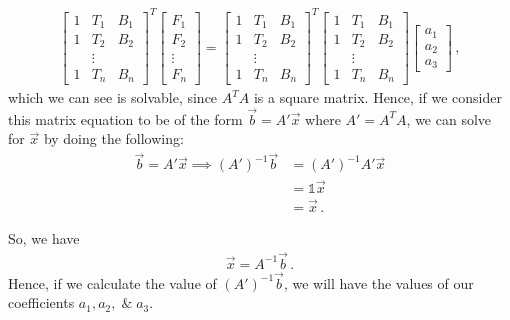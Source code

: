 \documentclass[11pt]{article}
\begin{document}
\begin{align*}
    \begin{bmatrix}
        1 & T_1 & B_1 \\
        1 & T_2 & B_2 \\
        & \vdots & \\
        1 & T_n & B_n
    \end{bmatrix} ^{T}
    \begin{bmatrix}
        F_1\\
        F_2 \\
        \vdots \\
        F_n
    \end{bmatrix}
    =
    \begin{bmatrix}
        1 & T_1 & B_1 \\
        1 & T_2 & B_2 \\
        & \vdots & \\
        1 & T_n & B_n
    \end{bmatrix} ^{T}
    \begin{bmatrix}
        1 & T_1 & B_1 \\
        1 & T_2 & B_2 \\
        & \vdots & \\
        1 & T_n & B_n
    \end{bmatrix}
    \begin{bmatrix}
        a_1 \\
        a_2 \\
        a_3
    \end{bmatrix} \, ,
\end{align*}
which we can see is solvable, since $A^T A$ is a square matrix.  
Hence, if we consider this matrix equation to be of the form $\overrightarrow{b} = A'\overrightarrow{x}$ where $A' = A^T A$, we can solve for $\overrightarrow{x}$ by doing the following:
\begin{align*}
    \overrightarrow{b} = A' \overrightarrow{x} \implies (A')^{-1}\overrightarrow{b} & = (A')^{-1}A' \overrightarrow{x} \\
    & = \mathds{1} \overrightarrow{x} \\
    & = \overrightarrow{x} \, .
\end{align*}

So, we have
\begin{align*}
    \overrightarrow{x} = A^{-1} \overrightarrow{b} \, .
\end{align*}
Hence, if we calculate the value of $(A')^{-1} \overrightarrow{b}$, we will have the values of our coefficients $a_1, a_2, \; \& \; a_3$.
\end{document}
